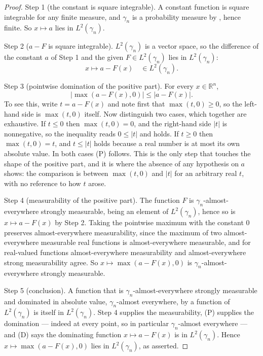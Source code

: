 \begin{proof}
Step 1 (the constant is square integrable).  A constant function is square
integrable for any finite measure, and $\gamma_n$ is a probability measure by
, hence finite.  So $x \mapsto a$ lies in $L^2(\gamma_n)$.

Step 2 ($a - F$ is square integrable).  $L^2(\gamma_n)$ is a vector space, so
the difference of the constant $a$ of Step 1 and the given $F \in L^2(\gamma_n)$
lies in $L^2(\gamma_n)$:
\[
  x \longmapsto a - F(x) \quad \in L^2(\gamma_n). \tag{D}
\]

Step 3 (pointwise domination of the positive part).  For every
$x \in \mathbb{R}^n$,
\[
  \bigl| \max(a - F(x), 0) \bigr| \leq \bigl| a - F(x) \bigr| . \tag{P}
\]
To see this, write $t = a - F(x)$ and note first that $\max(t,0) \geq 0$, so the
left-hand side is $\max(t,0)$ itself.  Now distinguish two cases, which together
are exhaustive.  If $t \leq 0$ then $\max(t,0) = 0$, and the right-hand side
$|t|$ is nonnegative, so the inequality reads $0 \leq |t|$ and holds.  If
$t \geq 0$ then $\max(t,0) = t$, and $t \leq |t|$ holds because a real number is
at most its own absolute value.  In both cases (P) follows.  This is the only
step that touches the shape of the positive part, and it is where the absence of
any hypothesis on $a$ shows: the comparison is between $\max(t,0)$ and $|t|$ for
an arbitrary real $t$, with no reference to how $t$ arose.

Step 4 (measurability of the positive part).  The function $F$ is
$\gamma_n$-almost-everywhere strongly measurable, being an element of
$L^2(\gamma_n)$, hence so is $x \mapsto a - F(x)$ by Step 2.  Taking the
pointwise maximum with the constant $0$ preserves almost-everywhere
measurability, since the maximum of two almost-everywhere measurable real
functions is almost-everywhere measurable, and for real-valued functions
almost-everywhere measurability and almost-everywhere strong measurability
agree.  So $x \mapsto \max(a - F(x), 0)$ is $\gamma_n$-almost-everywhere
strongly measurable.

Step 5 (conclusion).  A function that is $\gamma_n$-almost-everywhere strongly
measurable and dominated in absolute value, $\gamma_n$-almost everywhere, by a
function of $L^2(\gamma_n)$ is itself in $L^2(\gamma_n)$.  Step 4 supplies the
measurability, (P) supplies the domination --- indeed at every point, so in
particular $\gamma_n$-almost everywhere --- and (D) says the dominating function
$x \mapsto a - F(x)$ is in $L^2(\gamma_n)$.  Hence
$x \mapsto \max(a - F(x), 0)$ lies in $L^2(\gamma_n)$, as asserted.
\end{proof}
